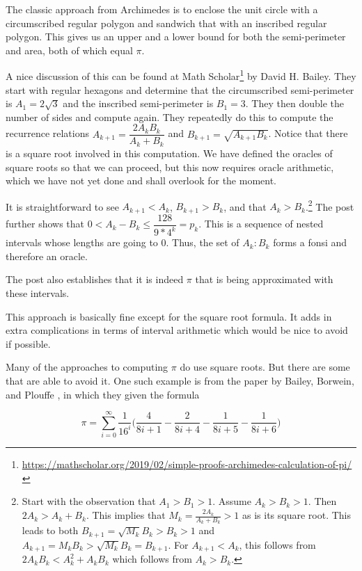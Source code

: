 \documentclass[12pt]{article}
\theoremstyle{remark}
\begin{document}
The classic approach from Archimedes is to enclose the unit circle with a circumscribed regular polygon and sandwich that with an inscribed regular polygon. This gives us an upper and a lower bound for both the semi-perimeter and area, both of which equal $\pi$. 

A nice discussion of this can be found at Math Scholar\footnote{\url{https://mathscholar.org/2019/02/simple-proofs-archimedes-calculation-of-pi/}} by David H. Bailey. They start with regular hexagons and determine that the circumscribed semi-perimeter is $A_1 = 2 \sqrt{3}$ and the inscribed semi-perimeter is $B_1 = 3$. They then double the number of sides and compute again. They repeatedly do this to compute the recurrence relations $A_{k+1} = \dfrac{2A_k B_k}{A_k + B_k}$ and $B_{k+1} = \sqrt{A_{k+1}B_k}$. Notice that there is a square root involved in this computation. We have defined the oracles of square roots so that we can proceed, but this now requires oracle arithmetic, which we have not yet done and shall overlook for the moment.  

It is straightforward to see $A_{k+1} < A_k$, $B_{k+1} > B_k$, and that $A_k > B_k$.\footnote{Start with the observation that $A_1 > B_1 > 1$. Assume $A_k > B_k > 1$. Then $2 A_k  > A_k + B_k$. This implies that $M_k = \frac{2A_k}{A_k + B_k}>1$ as is its square root. This leads to both $B_{k+1} = \sqrt{M_k} B_k > B_k > 1$  and $A_{k+1} = M_k B_k > \sqrt{M_k} B_k = B_{k+1}$.  For $A_{k+1} < A_k$, this follows from $2A_k B_k < A_k^2 + A_kB_k$ which follows from $A_k > B_k$.} The post further shows that $0 < A_k - B_k \leq \dfrac{128}{9*4^k} = p_k $. This is a sequence of nested intervals whose lengths are going to 0. Thus, the set of $A_k:B_k$ forms a fonsi and therefore an oracle. 

The post also establishes that it is indeed $\pi$ that is being approximated with these intervals.

This approach is basically fine except for the square root formula. It adds in extra complications in terms of interval arithmetic which would be nice to avoid if possible. 

Many of the approaches to computing $\pi$ do use square roots. But there are some that are able to avoid it. One such example is from the paper by Bailey, Borwein, and Plouffe \cite{BBP}, in which they given the formula 

\[ 
\pi = \sum_{i=0}^\infty \frac{1}{16^i} \bigg( \frac{4}{8i+1} - \frac{2}{8i+4} - \frac{1}{8i+5} - \frac{1}{8i+6} \bigg)
\]
\end{document}
